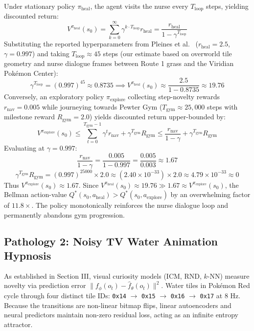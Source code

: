 \documentclass[journal,10pt,twocolumn]{IEEEtran}
\begin{document}
\begin{IEEEproof}
Under stationary policy $\pi_{\text{heal}}$, the agent visits the nurse every $T_{\text{loop}}$ steps, yielding discounted return:
\begin{equation}
V^{\pi_{\text{heal}}}(s_0) = \sum_{k=0}^\infty \gamma^{k \cdot T_{\text{loop}}} r_{\text{heal}} = \frac{r_{\text{heal}}}{1 - \gamma^{T_{\text{loop}}}}
\end{equation}
Substituting the reported hyperparameters from Pleines et al.~\cite{pleines2025pokemon} ($r_{\text{heal}} = 2.5$, $\gamma = 0.997$) and taking $T_{\text{loop}} \approx 45$ steps (our estimate based on overworld tile geometry and nurse dialogue frames between Route 1 grass and the Viridian Pok{\'e}mon Center):
\begin{equation}
\gamma^{T_{\text{loop}}} = (0.997)^{45} \approx 0.8735 \implies V^{\pi_{\text{heal}}}(s_0) \approx \frac{2.5}{1 - 0.8735} \approx 19.76
\end{equation}
Conversely, an exploratory policy $\pi_{\text{explore}}$ collecting step-novelty rewards $r_{\text{nav}} = 0.005$ while journeying towards Pewter Gym ($T_{\text{gym}} \approx 25{,}000$ steps with milestone reward $R_{\text{gym}} = 2.0$) yields discounted return upper-bounded by:
\begin{equation}
V^{\pi_{\text{explore}}}(s_0) \le \sum_{t=0}^{T_{\text{gym}}-1} \gamma^t r_{\text{nav}} + \gamma^{T_{\text{gym}}} R_{\text{gym}} \le \frac{r_{\text{nav}}}{1 - \gamma} + \gamma^{T_{\text{gym}}} R_{\text{gym}}
\end{equation}
Evaluating at $\gamma = 0.997$:
\begin{equation}
\frac{r_{\text{nav}}}{1 - \gamma} = \frac{0.005}{1 - 0.997} = \frac{0.005}{0.003} \approx 1.67
\end{equation}
\begin{equation}
\gamma^{T_{\text{gym}}} R_{\text{gym}} = (0.997)^{25000} \times 2.0 \approx (2.40 \times 10^{-33}) \times 2.0 \approx 4.79 \times 10^{-33} \approx 0
\end{equation}
Thus $V^{\pi_{\text{explore}}}(s_0) \approx 1.67$. Since $V^{\pi_{\text{heal}}}(s_0) \approx 19.76 \gg 1.67 \approx V^{\pi_{\text{explore}}}(s_0)$, the Bellman action-value $Q^*(s_0, a_{\text{heal}}) > Q^*(s_0, a_{\text{explore}})$ by an overwhelming factor of $11.8\times$. The policy monotonically reinforces the nurse dialogue loop and permanently abandons gym progression.
\end{IEEEproof}

\subsection{Pathology 2: Noisy TV Water Animation Hypnosis}
As established in Section III, visual curiosity models (ICM, RND, $k$-NN) measure novelty via prediction error $\|f_\phi(o_t) - \hat{f}_\theta(o_t)\|^2$. Water tiles in Pok{\'e}mon Red cycle through four distinct tile IDs: \texttt{0x14} $\to$ \texttt{0x15} $\to$ \texttt{0x16} $\to$ \texttt{0x17} at 8 Hz. Because the transitions are non-linear bitmap flips, linear autoencoders and neural predictors maintain non-zero residual loss, acting as an infinite entropy attractor.
\end{document}
